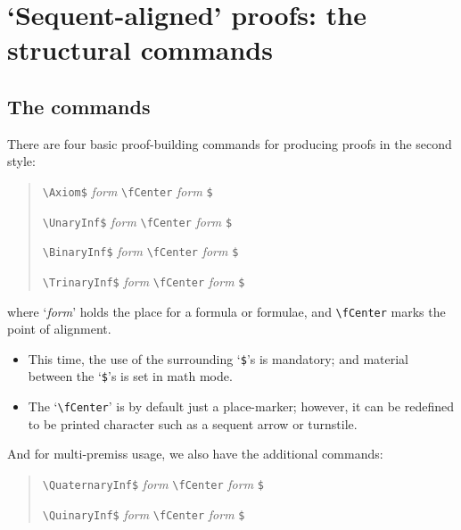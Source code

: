 \documentclass[11pt]{article}
\def\fCenter{{\mbox{$\vdash$}}}
\begin{document}
\section{`Sequent-aligned' proofs: the structural commands}
\subsection{The commands} There are four basic proof-building commands for producing proofs in the second style:
\begin{quote}
\begin{description}\setlength{\itemsep}{0.0in}
\item   \verb=\Axiom$= \textit{form} \verb=\fCenter= \textit{form} \verb=$=
\item   \verb=\UnaryInf$= \textit{form} \verb=\fCenter= \textit{form} \verb=$=
\item   \verb=\BinaryInf$= \textit{form} \verb=\fCenter= \textit{form} \verb=$=
\item   \verb=\TrinaryInf$= \textit{form} \verb=\fCenter= \textit{form} \verb=$=
\end{description}
\end{quote}  
where `\textit{form}' holds the place for a formula or formulae, and \verb=\fCenter= marks the point of alignment.
\begin{itemize}\setlength{\itemsep}{0.0in}
\item This time, the use of the surrounding `\verb=$='s is mandatory; and material between the `\verb=$='s is set in math mode.
\item The `\verb=\fCenter=' is by default just a place-marker; however, it can be redefined to be printed character such as a sequent arrow or turnstile.
\end{itemize}
And for multi-premiss usage, we also have the additional commands:
\begin{quote}
\begin{description}\setlength{\itemsep}{0.0in}
\item   \verb=\QuaternaryInf$= \textit{form} \verb=\fCenter= \textit{form} \verb=$=
\item   \verb=\QuinaryInf$= \textit{form} \verb=\fCenter= \textit{form} \verb=$=\end{description}
\end{quote}  
\end{document}
